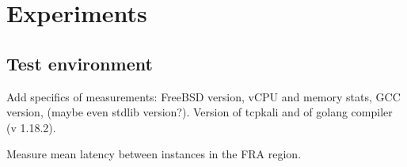 \section{Experiments}
\subsection{Test environment}
Add specifics of measurements: FreeBSD version, vCPU and memory stats, GCC version, (maybe even stdlib version?). Version of tcpkali and of golang compiler (v 1.18.2). 

Measure mean latency between instances in the FRA region.